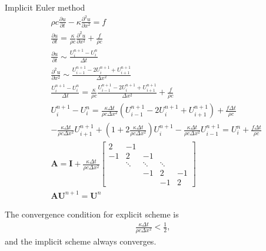 \documentclass[a4paper,10pt]{article}
\begin{document}
Implicit Euler method
\begin{align*}
& \rho c \frac{\partial u}{\partial t} - \kappa \frac{\partial ^2 u}{\partial x^2} = f \\
& \frac{\partial u}{\partial t} = \frac{\kappa}{\rho c} \frac{\partial ^2 u}{\partial x^2} + \frac{f}{\rho c} \\
& \frac{\partial u}{\partial t} \sim \frac{U_i^{n+1} - U_i^n}{\Delta t} \\
& \frac{\partial ^2 u}{\partial x^2} \sim \frac{U_{i-1}^{n+1} - 2 U_i^{n+1} + U_{i+1}^{n+1}}{\Delta x^2} \\
& \frac{U_i^{n+1} - U_i^n}{\Delta t} = \frac{\kappa}{\rho c} \frac{U_{i-1}^{n+1} - 2 U_i^{n+1} + U_{i+1}^{n+1}}{\Delta x^2} + \frac{f}{\rho c} \\
& U_i^{n+1} - U_i^n = \frac{\kappa \Delta t}{\rho c \Delta x^2} \left( U_{i-1}^{n+1} - 2 U_i^{n+1} + U_{i+1}^{n+1} \right) + \frac{f \Delta t}{\rho c} \\
& - \frac{\kappa \Delta t}{\rho c \Delta x^2} U_{i+1}^{n+1} + \left( 1 + 2 \frac{\kappa \Delta t}{\rho c \Delta x^2} \right) U_i^{n+1} - \frac{\kappa \Delta t}{\rho c \Delta x^2} U_{i-1}^{n+1} = U_i^n + \frac{f \Delta t}{\rho c} \\
& \bm A = \bm I + \frac{\kappa \Delta t}{\rho c \Delta x^2}
\begin{bmatrix}
2  & -1 & \  & \  & \  \\
-1 & 2  & -1 & \  & \  \\
\  & \ddots & \ddots & \ddots & \ \\
\  & \  & -1 & 2  & -1 \\
\  & \  & \  & -1 & 2 
\end{bmatrix} \\
& \bm A \bm U^{n+1} = \bm U^n
\end{align*}

The convergence condition for explicit scheme is 
\begin{align*}
\frac{\kappa \Delta t}{\rho c \Delta x^2} < \frac{1}{2},
\end{align*}
and the implicit scheme always converges.
\end{document}
